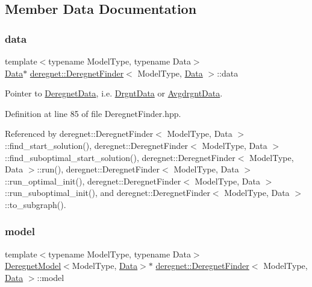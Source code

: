 \subsection{Member Data Documentation}
\mbox{\label{classderegnet_1_1DeregnetFinder_ab158f2a6bb7f39ed3d6e4a9ffe568232}} 
\subsubsection{\texorpdfstring{data}{data}}
{\footnotesize\ttfamily template$<$typename Model\+Type, typename Data$>$ \\
\hyperlink{avgdrgnt_8cpp_a1d1235306db276e9b36acba1db1509e8}{Data}$\ast$ \hyperlink{classderegnet_1_1DeregnetFinder}{deregnet\+::\+Deregnet\+Finder}$<$ Model\+Type, \hyperlink{avgdrgnt_8cpp_a1d1235306db276e9b36acba1db1509e8}{Data} $>$\+::data\hspace{0.3cm}{\ttfamily [private]}}



Pointer to \hyperlink{classderegnet_1_1DeregnetData}{Deregnet\+Data}, i.\+e. \hyperlink{classderegnet_1_1DrgntData}{Drgnt\+Data} or \hyperlink{classderegnet_1_1AvgdrgntData}{Avgdrgnt\+Data}. 



Definition at line 85 of file Deregnet\+Finder.\+hpp.



Referenced by deregnet\+::\+Deregnet\+Finder$<$ Model\+Type, Data $>$\+::find\+\_\+start\+\_\+solution(), deregnet\+::\+Deregnet\+Finder$<$ Model\+Type, Data $>$\+::find\+\_\+suboptimal\+\_\+start\+\_\+solution(), deregnet\+::\+Deregnet\+Finder$<$ Model\+Type, Data $>$\+::run(), deregnet\+::\+Deregnet\+Finder$<$ Model\+Type, Data $>$\+::run\+\_\+optimal\+\_\+init(), deregnet\+::\+Deregnet\+Finder$<$ Model\+Type, Data $>$\+::run\+\_\+suboptimal\+\_\+init(), and deregnet\+::\+Deregnet\+Finder$<$ Model\+Type, Data $>$\+::to\+\_\+subgraph().

\mbox{\label{classderegnet_1_1DeregnetFinder_ad922d8e38124b4c75daac29a928fcf5b}} 
\subsubsection{\texorpdfstring{model}{model}}
{\footnotesize\ttfamily template$<$typename Model\+Type, typename Data$>$ \\
\hyperlink{classderegnet_1_1DeregnetModel}{Deregnet\+Model}$<$Model\+Type, \hyperlink{avgdrgnt_8cpp_a1d1235306db276e9b36acba1db1509e8}{Data}$>$$\ast$ \hyperlink{classderegnet_1_1DeregnetFinder}{deregnet\+::\+Deregnet\+Finder}$<$ Model\+Type, \hyperlink{avgdrgnt_8cpp_a1d1235306db276e9b36acba1db1509e8}{Data} $>$\+::model\hspace{0.3cm}{\ttfamily [private]}}



